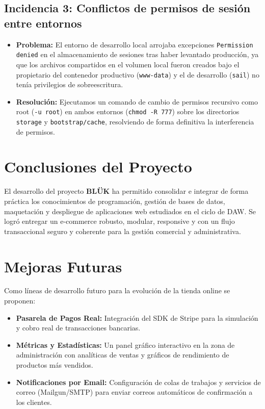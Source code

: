\subsection{Incidencia 3: Conflictos de permisos de sesión entre entornos}
\begin{itemize}
    \item \textbf{Problema:} El entorno de desarrollo local arrojaba excepciones \texttt{Permission denied} en el almacenamiento de sesiones tras haber levantado producción, ya que los archivos compartidos en el volumen local fueron creados bajo el propietario del contenedor productivo (\texttt{www-data}) y el de desarrollo (\texttt{sail}) no tenía privilegios de sobreescritura.
    \item \textbf{Resolución:} Ejecutamos un comando de cambio de permisos recursivo como root (\texttt{-u root}) en ambos entornos (\texttt{chmod -R 777}) sobre los directorios \texttt{storage} y \texttt{bootstrap/cache}, resolviendo de forma definitiva la interferencia de permisos.
\end{itemize}

\section{Conclusiones del Proyecto}
El desarrollo del proyecto \textbf{BLÜK} ha permitido consolidar e integrar de forma práctica los conocimientos de programación, gestión de bases de datos, maquetación y despliegue de aplicaciones web estudiados en el ciclo de DAW. Se logró entregar un e-commerce robusto, modular, responsive y con un flujo transaccional seguro y coherente para la gestión comercial y administrativa.

\section{Mejoras Futuras}
Como líneas de desarrollo futuro para la evolución de la tienda online se proponen:
\begin{itemize}
    \item \textbf{Pasarela de Pagos Real:} Integración del SDK de Stripe para la simulación y cobro real de transacciones bancarias.
    \item \textbf{Métricas y Estadísticas:} Un panel gráfico interactivo en la zona de administración con analíticas de ventas y gráficos de rendimiento de productos más vendidos.
    \item \textbf{Notificaciones por Email:} Configuración de colas de trabajos y servicios de correo (Mailgun/SMTP) para enviar correos automáticos de confirmación a los clientes.
\end{itemize}
